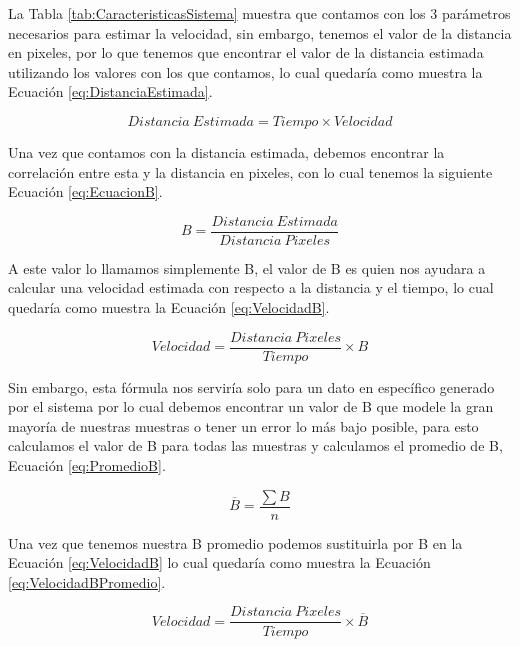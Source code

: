 La Tabla \ref{tab:CaracteristicasSistema} muestra que contamos con los 3 parámetros necesarios para estimar la velocidad, sin embargo, tenemos el valor de la distancia en pixeles, por lo que tenemos que encontrar el valor de la distancia estimada utilizando los valores con los que contamos, lo cual quedaría como muestra la Ecuación \ref{eq:DistanciaEstimada}.

\begin{equation}
    \label{eq:DistanciaEstimada}
    Distancia\:Estimada = Tiempo \times Velocidad
\end{equation}

Una vez que contamos con la distancia estimada, debemos encontrar la correlación entre esta y la distancia en pixeles, con lo cual tenemos la siguiente Ecuación \ref{eq:EcuacionB}.

\begin{equation}
    \label{eq:EcuacionB}
    B = \frac{Distancia \: Estimada}{Distancia \: Pixeles}
\end{equation}

A este valor lo llamamos simplemente B, el valor de B es quien nos ayudara a calcular una velocidad estimada con respecto a la distancia y el tiempo, lo cual quedaría como muestra la Ecuación \ref{eq:VelocidadB}.

\begin{equation}
    \label{eq:VelocidadB}
    Velocidad = \frac{Distancia \: Pixeles}{Tiempo} \times B
\end{equation}

Sin embargo, esta fórmula nos serviría solo para un dato en específico generado por el sistema por lo cual debemos encontrar un valor de B que modele la gran mayoría de nuestras muestras o tener un error lo más bajo posible, para esto calculamos el valor de B para todas las muestras y calculamos el promedio de B, Ecuación \ref{eq:PromedioB}.

\begin{equation}
    \label{eq:PromedioB}
    \overline{B} = \frac{\sum B}{n}
\end{equation}

Una vez que tenemos nuestra B promedio podemos sustituirla por B en la Ecuación \ref{eq:VelocidadB} lo cual quedaría como muestra la Ecuación \ref{eq:VelocidadBPromedio}.

\begin{equation}
    \label{eq:VelocidadBPromedio}
    Velocidad = \frac{Distancia \: Pixeles}{Tiempo} \times \overline{B}
\end{equation}



